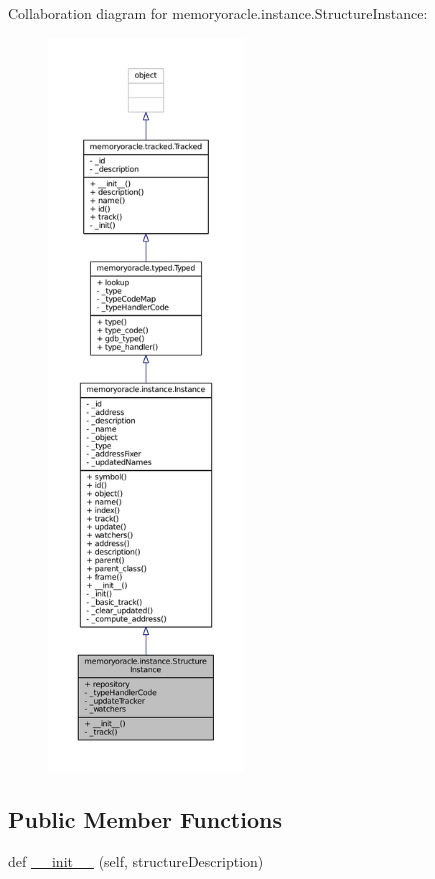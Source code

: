 Collaboration diagram for memoryoracle.\+instance.\+Structure\+Instance\+:\nopagebreak
\begin{figure}[H]
\begin{center}
\leavevmode
\includegraphics[height=550pt]{classmemoryoracle_1_1instance_1_1StructureInstance__coll__graph}
\end{center}
\end{figure}
\subsection*{Public Member Functions}
\begin{DoxyCompactItemize}
\item 
def \hyperlink{classmemoryoracle_1_1instance_1_1StructureInstance_a57c0ed2139601ff071792d8415e0e02a}{\+\_\+\+\_\+init\+\_\+\+\_\+} (self, structure\+Description)
\end{DoxyCompactItemize}
